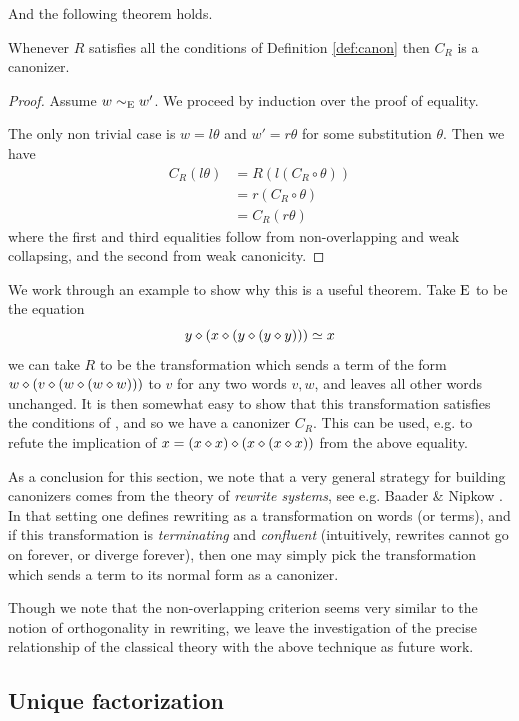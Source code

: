 And the following theorem holds.
\begin{theorem}\label{thm:canon}
  Whenever $R$ satisfies all the conditions of Definition \ref{def:canon} then $C_R$ is a canonizer.
\end{theorem}
\begin{proof}
  Assume $w\sim_{\mathrm{E}}w'$. We proceed by induction over the proof of equality.

  The only non trivial case is $w = l\theta$ and $w'=r\theta$ for some substitution $\theta$.
  Then we have
  \begin{align}
    C_R(l\theta) &= R(l(C_R\circ\theta)) \\
                 &= r(C_R\circ\theta)\\
                 &= C_R(r\theta)
  \end{align}
  where the first and third equalities follow from non-overlapping and weak collapsing, and the second from weak canonicity.
\end{proof}

We work through an example to show why this is a useful theorem. Take $\mathrm{E}$ to be the equation
\[
  y \diamond (x \diamond (y \diamond (y \diamond y)))\simeq x
\]
we can take $R$ to be the transformation which sends a term of the form $w \diamond (v \diamond (w \diamond (w \diamond w)))$ to $v$ for any two words $v, w$, and leaves all other words unchanged.
It is then somewhat easy to show that this transformation satisfies the conditions of , and so we have a canonizer $C_R$.
This can be used, e.g. to refute the implication of $x = (x \diamond x) \diamond (x \diamond (x \diamond x))$ from the above equality.

As a conclusion for this section, we note that a very general strategy for building canonizers comes from the theory of \emph{rewrite systems}, see e.g. Baader \& Nipkow \cite{term-rewriting}.
In that setting one defines rewriting as a transformation on words (or terms), and if this transformation is \emph{terminating} and \emph{confluent} (intuitively, rewrites cannot go on forever, or diverge forever), then one may simply pick the transformation which sends a term to its normal form as a canonizer.

Though we note that the non-overlapping criterion seems very similar to the notion of orthogonality in rewriting, we leave the investigation of the precise relationship of the classical theory with the above technique as future work.

\subsection{Unique factorization}

